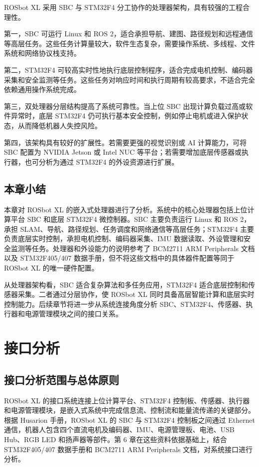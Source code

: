 \documentclass[UTF8,a4paper,12pt]{ctexrep}
\begin{document}
ROSbot XL 采用 SBC 与 STM32F4 分工协作的处理器架构，具有较强的工程合理性。

第一，SBC 可运行 Linux 和 ROS 2，适合承担导航、建图、路径规划和远程通信等高层任务。这些任务计算量较大，软件生态复杂，需要操作系统、多线程、文件系统和网络协议栈支持。

第二，STM32F4 可较高实时性地执行底层控制程序，适合完成电机控制、编码器采集和安全监测等任务。这些任务对响应时间和执行周期有较高要求，不适合完全依赖通用操作系统完成。

第三，双处理器分层结构提高了系统可靠性。当上位 SBC 出现计算负载过高或软件异常时，底层 STM32F4 仍可执行基本安全控制，例如停止电机或进入保护状态，从而降低机器人失控风险。

第四，该架构具有较好的扩展性。若需要更强的视觉识别或 AI 计算能力，可将 SBC 配置为 NVIDIA Jetson 或 Intel NUC 等平台；若需要增加底层传感器或执行器，也可分析为通过 STM32F4 的外设资源进行扩展。

\section{本章小结}

本章对 ROSbot XL 的嵌入式处理器进行了分析。系统中的核心处理器包括上位计算平台 SBC 和底层 STM32F4 微控制器。SBC 主要负责运行 Linux 和 ROS 2，承担 SLAM、导航、路径规划、任务调度和网络通信等高层任务；STM32F4 主要负责底层实时控制，承担电机控制、编码器采集、IMU 数据读取、外设管理和安全监测等任务。处理器和外设能力的说明参考了 BCM2711 ARM Peripherals 文档以及 STM32F405/407 数据手册，但不将这些文档中的具体器件配置等同于 ROSbot XL 的唯一硬件配置。

从处理器架构看，SBC 适合复杂算法和多任务应用，STM32F4 适合底层控制和传感器采集。二者通过分层协作，使 ROSbot XL 同时具备高层智能计算和底层实时控制能力。后续章节将进一步从系统连接角度分析 SBC、STM32F4、传感器、执行器和电源管理模块之间的接口关系。

\chapter{接口分析}

\section{接口分析范围与总体原则}

ROSbot XL 的接口系统连接上位计算平台、STM32F4 控制板、传感器、执行器和电源管理模块，是嵌入式系统中完成信息流、控制流和能量流传递的关键部分。根据 Husarion 手册，ROSbot XL 的 SBC 与 STM32F4 控制板之间通过 Ethernet 通信，机器人包含四个直流电机及编码器、IMU、电源管理板、电池、USB Hub、RGB LED 和扬声器等部件。第 6 章在这些资料依据基础上，结合 STM32F405/407 数据手册和 BCM2711 ARM Peripherals 文档，对系统接口进行分析。
\end{document}
